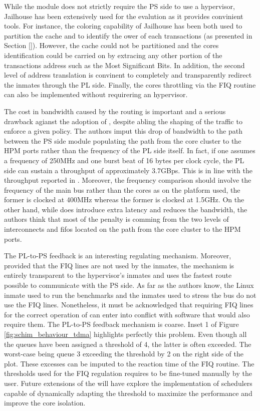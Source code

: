 While the \schim module does not strictly require the PS side to use a hypervisor,
Jailhouse has been extensively used for the evalution as it provides convinient tools.
For instance, the coloring capability of Jailhouse has been both used to partition
the cache and to identify the ower of each transactions (as presented in Section \ref{}).
However, the cache could not be partitioned and the cores identification could be
carried on by extracing any other portion of the transactions address such as the
Most Significant Bits. In addition, the second level of address translation is
convinent to completely and transparently redirect the inmates through the PL side.
Finally, the cores throttling via the FIQ routine can also be implemented without
requirering an hypervisor.

The cost in bandwidth caused by the routing is important and a serious drawback
agianst the adoption of \schim, despite abling the shaping of the traffic to
enforce a given policy.
The authors imput this drop of bandwidth to the path between the PS side module
populating the path from the core cluster to the HPM ports rather than the
frequency of the PL side itself. In fact, if one assumes a frequency of 250MHz
and one burst beat of 16 bytes per clock cycle, the PL side can sustain a
throughput of approximately 3.7GBps. This is in line with the throughput reported
in \cite{uiuc-xilinx-port-study}. Moreover, the frequency comparison should involve the
frequency of the main bus rather than the cores as on the platform used, the former
is clocked at 400MHz whereas the former is clocked at 1.5GHz. On the other hand,
while \schim does introduce extra latency and reduces the bandwidth, the authors
think that most of the penalty is comming from the two levels of interconnects
and fifos located on the path from the core cluster to the HPM ports.

The PL-to-PS feedback is an interesting regulating mechanism. Moreover, provided
that the FIQ lines are not used by the inmates, the mechanism is entirely transparent
to the hypervisor's inmates and uses the fastest route possible to communicate
with the PS side. As far as the authors know, the Linux inmate used to run the
benchmarks and the inmates used to stress the bus do not use the FIQ lines.
Nonetheless, it must be acknowledged that requiring FIQ lines for the correct
operation of \schim can enter into conflict with software that would also
require them.
The PL-to-PS feedback mechanism is coarse. Inset 1 of Figure
\ref{fig:schim_behaviour_tdma} highlights perfectly this problem. Even though all
the queues have been assigned a threshold of 4, the latter is often exceeded.
The worst-case being queue 3 exceeding the threshold by 2 on the right side of the
plot. These excesses can be imputed to the reaction time of the FIQ routine. The
thresholds used for the FIQ regulation requires to be fine-tuned manually by the
user. Future extensions of the \schim will have explore the implementation of
schedulers capable of dynamically adapting the threshold to maximize the performance
and improve the core isolation.
\color{black}
